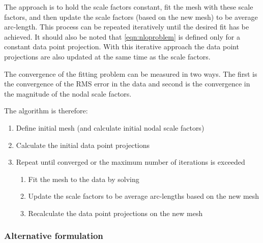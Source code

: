 The approach is to hold the scale factors constant, fit the mesh with
these scale factors, and then update the scale factors (based on the new mesh)
to be average arc-length. This process can be repeated iteratively until the
desired fit has be achieved. It should also be noted that
\eqref{eqn:nloproblem} is defined only for a constant data point projection.
With this iterative approach the data point projections are also updated
at the same time as the scale factors.

The convergence of the fitting problem can be measured in two ways. The first
is the convergence of the RMS error in the data and second is the convergence
in the magnitude of the nodal scale factors.

The algorithm is therefore:
\begin{enumerate}
  \item Define initial mesh (and calculate initial nodal scale factors)
  \item Calculate the initial data point projections
  \item Repeat until converged or the maximum number of iterations is exceeded
  \begin{enumerate}
    \item Fit the mesh to the data by solving 
    \item Update the scale factors to be average arc-lengths based on the new
      mesh
    \item Recalculate the data point projections on the new mesh
  \end{enumerate}
\end{enumerate}

\subsubsection{Alternative formulation}
\label{sec:alternativeformulation}

